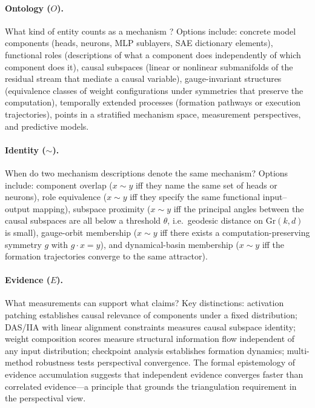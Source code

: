 \documentclass{article}
\newcommand{\Gr}{\mathrm{Gr}}
\begin{document}
\paragraph{Ontology ($O$).}
What kind of entity counts as a mechanism \citep{quine1948}?
Options include: concrete
model components (heads, neurons, MLP sublayers, SAE dictionary
elements), functional roles (descriptions of what a component does
independently of which component does it), causal subspaces (linear or
nonlinear submanifolds of the residual stream that mediate a causal
variable), gauge-invariant structures (equivalence classes of weight
configurations under symmetries that preserve the computation),
temporally extended processes (formation pathways or execution
trajectories), points in a stratified mechanism space, measurement
perspectives, and predictive models.

\paragraph{Identity ($\sim$).}
When do two mechanism descriptions denote the same mechanism?  Options
include: component overlap ($x \sim y$ iff they name the same set of
heads or neurons), role equivalence ($x \sim y$ iff they specify the
same functional input--output mapping), subspace proximity ($x \sim y$
iff the principal angles between the causal subspaces are all below a
threshold $\theta$, i.e.\ geodesic distance on $\Gr(k,d)$ is small),
gauge-orbit membership ($x \sim y$ iff there exists a computation-preserving
symmetry $g$ with $g \cdot x = y$), and dynamical-basin membership
($x \sim y$ iff the formation trajectories converge to the same
attractor).

\paragraph{Evidence ($E$).}
What measurements can support what claims?  Key distinctions: activation
patching establishes causal relevance of components under a fixed
distribution; DAS/IIA with linear alignment constraints measures causal
subspace identity; weight composition scores measure structural
information flow independent of any input distribution; checkpoint
analysis establishes formation dynamics; multi-method robustness tests
perspectival convergence.  The formal epistemology of evidence
accumulation \citep{earman1992,howson1989} suggests that independent
evidence converges faster than correlated evidence---a principle that
grounds the triangulation requirement in the perspectival view.
\end{document}

